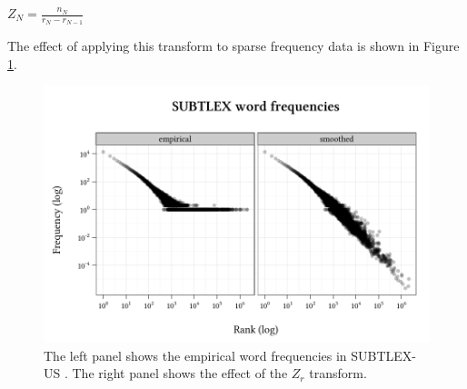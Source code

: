 \begin{unlabeledexample}
$\displaystyle Z_N = \frac{n_N}{r_N - r_{N - 1}}$
\end{unlabeledexample}

\noindent The effect of applying this transform to sparse frequency data is shown in Figure \ref{subtlex}.

\begin{figure}
\centering
\includegraphics{zr.pdf}
\caption{The left panel shows the empirical word frequencies in SUBTLEX-US \citep{Brysbaert2009}. The right panel shows the effect of the $Z_r$ transform.}
\label{subtlex}
\end{figure}
